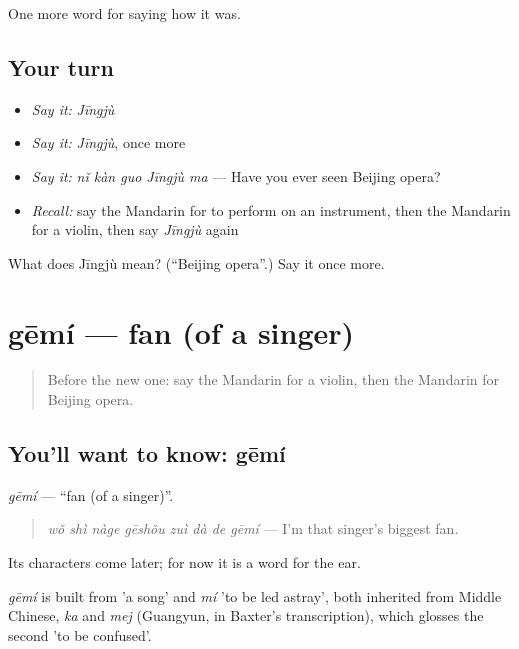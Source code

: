 \begin{grammarlens}[title={What you've built}]
One more word for saying how it was.
\end{grammarlens}

\subsection*{Your turn}
\begin{itemize}
\raggedright
  \item \emph{Say it:} \emph{Jīngjù}
  \item \emph{Say it:} \emph{Jīngjù}, once more
  \item \emph{Say it:} \emph{nǐ kàn guo Jīngjù ma} — Have you ever seen Beijing opera?
  \item \emph{Recall:} say the Mandarin for to perform on an instrument, then the Mandarin for a violin, then say \emph{Jīngjù} again
\end{itemize}

\begin{tcolorbox}[breakable,colback=teal!4,colframe=teal!35!black,title={Before you move on}]
What does Jīngjù mean? (\textquotedblleft{}Beijing opera\textquotedblright{}.) Say it once more.
\end{tcolorbox}
\section[gēmí]{gēmí — fan (of a singer)}

\label{lesson:ZH-C506-gemi}



\begin{quote}
Before the new one: say the Mandarin for a violin, then the Mandarin for Beijing opera.
\end{quote}

\subsection*{You'll want to know: gēmí}
\emph{gēmí} — \textquotedblleft{}fan (of a singer)\textquotedblright{}.

\begin{quote}
\emph{wǒ shì nàge gēshǒu zuì dà de gēmí} — I'm that singer's biggest fan.
\end{quote}

Its characters come later; for now it is a word for the ear.

\begin{cousinweb}
\emph{gēmí} is built from  'a song' and \emph{mí} 'to be led astray', both inherited from Middle Chinese, \emph{ka} and \emph{mej} (Guangyun, in Baxter's transcription), which glosses the second 'to be confused'.
\end{cousinweb}

